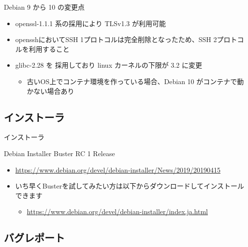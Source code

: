 \begin{frame}{Debian 9 から 10 の変更点}%

  \begin{itemize}
  \item openssl-1.1.1 系の採用により TLSv1.3 が利用可能
  \item opensshにおいてSSH 1プロトコルは完全削除となったため、SSH 2プロトコルを利用すること
  \item glibc-2.28 を 採用しており linux カーネルの下限が 3.2 に変更
    \begin{itemize}
    \item 古いOS上でコンテナ環境を作っている場合、Debian 10 がコンテナで動かない場合あり
    \end{itemize}
  \end{itemize}

\end{frame}


\subsection{インストーラ}

\begin{frame}{インストーラ}%

Debian Installer Buster RC 1 Release

\begin{itemize}
  \item \url{https://www.debian.org/devel/debian-installer/News/2019/20190415}
  \item いち早くBusterを試してみたい方は以下からダウンロードしてインストールできます
  \begin{itemize}
    \item \url{https://www.debian.org/devel/debian-installer/index.ja.html}
  \end{itemize}
\end{itemize}

\end{frame}


\subsection{バグレポート}


